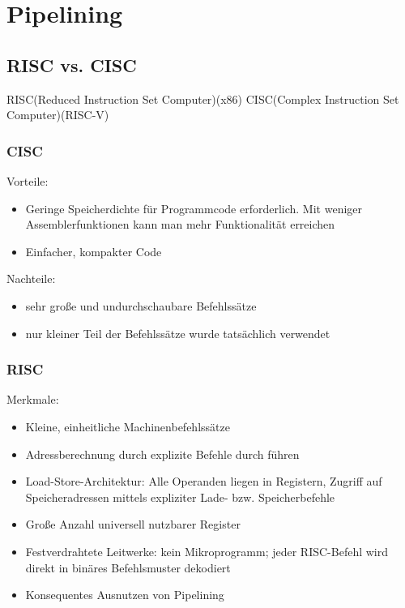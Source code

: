\section{Pipelining}
	\subsection{RISC vs. CISC}
		RISC(Reduced Instruction Set Computer)(x86) \newline
		CISC(Complex Instruction Set Computer)(RISC-V)
		\subsubsection{CISC}
			Vorteile: \newline
			\begin{itemize}
				\item Geringe Speicherdichte für Programmcode erforderlich. Mit weniger Assemblerfunktionen kann man mehr Funktionalität erreichen
				\item Einfacher, kompakter Code
			\end{itemize}
			Nachteile: \newline
			\begin{itemize}
				\item sehr große und undurchschaubare Befehlssätze
				\item nur kleiner Teil der Befehlssätze wurde tatsächlich verwendet
			\end{itemize}
		\subsubsection{RISC}	
			Merkmale: \newline
			\begin{itemize}
				\item Kleine, einheitliche Machinenbefehlssätze
				\item Adressberechnung durch explizite Befehle durch führen
				\item Load-Store-Architektur: Alle Operanden liegen in Registern, Zugriff auf Speicheradressen mittels expliziter Lade- bzw. Speicherbefehle
				\item Große Anzahl universell nutzbarer Register
				\item Festverdrahtete Leitwerke: kein Mikroprogramm; jeder RISC-Befehl wird direkt in binäres Befehlsmuster dekodiert
				\item Konsequentes Ausnutzen von Pipelining
			\end{itemize}
